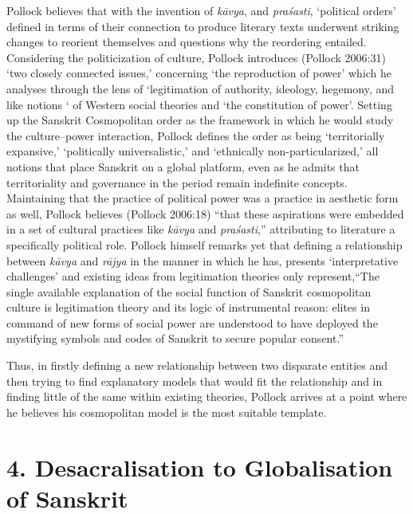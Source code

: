 Pollock believes that with the invention of \textit{kāvya}, and \textit{praśasti}, ‘political orders’ defined in terms of their connection to produce literary texts underwent striking changes to reorient themselves and questions why the reordering entailed. Considering the politicization of culture, Pollock introduces (Pollock 2006:31) ‘two closely connected issues,’ concerning ‘the reproduction of power’ which he analyses through the lens of ‘legitimation of authority, ideology, hegemony, and like notions ‘ of Western social theories and ‘the constitution of power’. Setting up the Sanskrit Cosmopolitan order as the framework in which he would study the culture–power interaction, Pollock defines the order as being ‘territorially expansive,’ ‘politically universalistic,’ and ‘ethnically non-particularized,’ all notions that place Sanskrit on a global platform, even as he admits that territoriality and governance in the period remain indefinite concepts. Maintaining that the practice of political power was a practice in aesthetic form as well, Pollock believes (Pollock 2006:18) “that these aspirations were embedded in a set of cultural practices like \textit{kāvya} and \textit{praśasti},” attributing to literature a specifically political role. Pollock himself remarks yet that defining a relationship between \textit{kāvya} and \textit{rājya} in the manner in which he has, presents ‘interpretative challenges’ and existing ideas from legitimation theories only represent,“The single available explanation of the social function of Sanskrit cosmopolitan culture is legitimation theory and its logic of instrumental reason: elites in command of new forms of social power are understood to have deployed the mystifying symbols and codes of Sanskrit to secure popular consent.”

Thus, in firstly defining a new relationship between two disparate entities and then trying to find explanatory models that would fit the relationship and in finding little of the same within existing theories, Pollock arrives at a point where he believes his cosmopolitan model is the most suitable template.


\section*{4. Desacralisation to Globalisation of Sanskrit}


